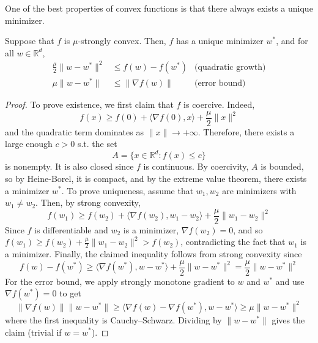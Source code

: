 	One of the best properties of convex functions is that there always exists a unique minimizer. 

	\begin{theorem}
		Suppose that $f$ is $\mu$-strongly convex. Then, $f$ has a unique minimizer $w^\ast$, and for all $w \in \mathbb{R}^d$, 
		\begin{align}
			\frac{\mu}{2} \|w - w^\ast\|^2 & \leq f(w) - f(w^\ast) & \text{(quadratic growth)} \\ 
			\mu \|w - w^\ast\| & \leq \|\nabla f(w)\| & \text{(error bound)}
		\end{align}
	\end{theorem}
	\begin{proof}
	  To prove existence, we first claim that $f$ is coercive. Indeed, 
		\begin{equation}
			f(x) \geq f(0) + \langle \nabla f(0), x \rangle + \frac{\mu}{2} \|x\|^2
		\end{equation}
		and the quadratic term dominates as $\|x\| \to +\infty$. Therefore, there exists a large enough $c > 0$ s.t. the set 
		\begin{equation}
			A = \{ x \in \mathbb{R}^d \colon f(x) \leq c \}
		\end{equation}
		is nonempty. It is also closed since $f$ is continuous. By coercivity, $A$ is bounded, so by Heine-Borel, it is compact, and by the extreme value theorem, there exists a minimizer $w^\ast$. To prove uniqueness, assume that $w_1, w_2$ are minimizers with $w_1 \neq w_2$. Then, by strong convexity, 
		\begin{equation}
			f(w_1) \geq f(w_2) + \langle \nabla f(w_2), w_1 - w_2 \rangle + \frac{\mu}{2} \|w_1 - w_2\|^2
		\end{equation}
		Since $f$ is differentiable and $w_2$ is a minimizer, $\nabla f(w_2) = 0$, and so $f(w_1) \geq f(w_2) + \frac{\mu}{2} \|w_1 - w_2\|^2 > f(w_2)$, contradicting the fact that $w_1$ is a minimizer. Finally, the claimed inequality follows from strong convexity since 
		\begin{equation}
			f(w) - f(w^\ast) \geq \langle \nabla f(w^\ast), w - w^\ast \rangle + \frac{\mu}{2} \|w - w^\ast\|^2 = \frac{\mu}{2} \|w - w^\ast\|^2
		\end{equation}
		For the error bound, we apply strongly monotone gradient to $w$ and $w^\ast$ and use $\nabla f(w^\ast) = 0$ to get 
		\begin{equation}
			\|\nabla f(w)\| \|w - w^\ast\| \geq \langle \nabla f(w) - \nabla f(w^\ast), w - w^\ast \rangle \geq \mu \|w - w^\ast\|^2
		\end{equation}
		where the first inequality is Cauchy--Schwarz. Dividing by $\|w - w^\ast\|$ gives the claim (trivial if $w = w^\ast$). 
	\end{proof}
	
